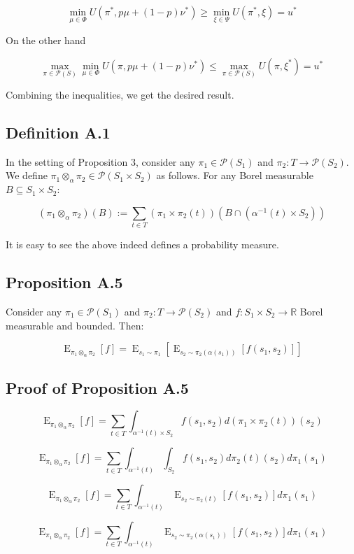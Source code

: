 \documentclass[a4paper]{article}
\DeclareMathOperator{\E}{E}
\newcommand{\Reals}{\mathbb{R}}
\newcommand{\Prob}{\mathcal{P}}
\begin{document}
$$\min_{\mu \in \Phi} U(\pi^*,p\mu + (1-p)\nu^*) \geq \min_{\xi \in \Psi} U(\pi^*,\xi)=u^*$$

On the other hand

$$\max_{\pi \in \Prob(S)} \min_{\mu \in \Phi} U(\pi,p\mu + (1-p)\nu^*) \leq \max_{\pi \in \Prob(S)}  U(\pi,\xi^*)=u^*$$

Combining the inequalities, we get the desired result.

\subsection{Definition A.1}

In the setting of Proposition 3, consider any ${\pi_1 \in \Prob(S_1)}$ and ${\pi_2: T \rightarrow \Prob(S_2)}$. We define ${\pi_1 \otimes_\alpha \pi_2 \in \Prob(S_1 \times S_2)}$ as follows. For any Borel measurable ${B \subseteq S_1 \times S_2}$:

$$(\pi_1 \otimes_\alpha \pi_2)(B):=\sum_{t \in T} (\pi_1 \times \pi_2(t))(B \cap (\alpha^{-1}(t) \times S_2))$$ 

It is easy to see the above indeed defines a probability measure.

\subsection{Proposition A.5}

Consider any ${\pi_1 \in \Prob(S_1)}$ and ${\pi_2: T \rightarrow \Prob(S_2)}$ and ${f: S_1 \times S_2 \rightarrow \Reals}$ Borel measurable and bounded. Then:

$$\E_{\pi_1 \otimes_\alpha \pi_2}[f] = \E_{s_1 \sim \pi_1}[\E_{s_2 \sim \pi_2(\alpha(s_1))}[f(s_1, s_2)]]$$

\subsection{Proof of Proposition A.5}

$$\E_{\pi_1 \otimes_\alpha \pi_2}[f] = \sum_{t \in T} \int_{\alpha^{-1}(t) \times S_2} f(s_1, s_2) d(\pi_1 \times \pi_2(t))(s_2)$$

$$\E_{\pi_1 \otimes_\alpha \pi_2}[f] = \sum_{t \in T} \int_{\alpha^{-1}(t)} \int_{S_2} f(s_1, s_2) d\pi_2(t)(s_2) d\pi_1(s_1)$$

$$\E_{\pi_1 \otimes_\alpha \pi_2}[f] = \sum_{t \in T} \int_{\alpha^{-1}(t)} \E_{s_2 \sim \pi_2(t)}[f(s_1,s_2)] d\pi_1(s_1)$$

$$\E_{\pi_1 \otimes_\alpha \pi_2}[f] = \sum_{t \in T} \int_{\alpha^{-1}(t)} \E_{s_2 \sim \pi_2(\alpha(s_1))}[f(s_1,s_2)] d\pi_1(s_1)$$
\end{document}
